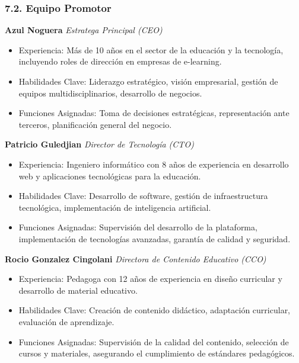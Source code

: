 \documentclass[
]{article}
\providecommand{\tightlist}{%
  \setlength{\itemsep}{0pt}\setlength{\parskip}{0pt}}
\begin{document}
\subsubsection{7.2. Equipo Promotor}\label{equipo-promotor}

\textbf{Azul Noguera} \emph{Estratega Principal (CEO)}

\begin{itemize}
\tightlist
\item
  Experiencia: Más de 10 años en el sector de la educación y la
  tecnología, incluyendo roles de dirección en empresas de e-learning.
\item
  Habilidades Clave: Liderazgo estratégico, visión empresarial, gestión
  de equipos multidisciplinarios, desarrollo de negocios.
\item
  Funciones Asignadas: Toma de decisiones estratégicas, representación
  ante terceros, planificación general del negocio.
\end{itemize}

\textbf{Patricio Guledjian} \emph{Director de Tecnología (CTO)}

\begin{itemize}
\tightlist
\item
  Experiencia: Ingeniero informático con 8 años de experiencia en
  desarrollo web y aplicaciones tecnológicas para la educación.
\item
  Habilidades Clave: Desarrollo de software, gestión de infraestructura
  tecnológica, implementación de inteligencia artificial.
\item
  Funciones Asignadas: Supervisión del desarrollo de la plataforma,
  implementación de tecnologías avanzadas, garantía de calidad y
  seguridad.
\end{itemize}

\textbf{Rocio Gonzalez Cingolani} \emph{Directora de Contenido Educativo
(CCO)}

\begin{itemize}
\tightlist
\item
  Experiencia: Pedagoga con 12 años de experiencia en diseño curricular
  y desarrollo de material educativo.
\item
  Habilidades Clave: Creación de contenido didáctico, adaptación
  curricular, evaluación de aprendizaje.
\item
  Funciones Asignadas: Supervisión de la calidad del contenido,
  selección de cursos y materiales, asegurando el cumplimiento de
  estándares pedagógicos.
\end{itemize}
\end{document}
